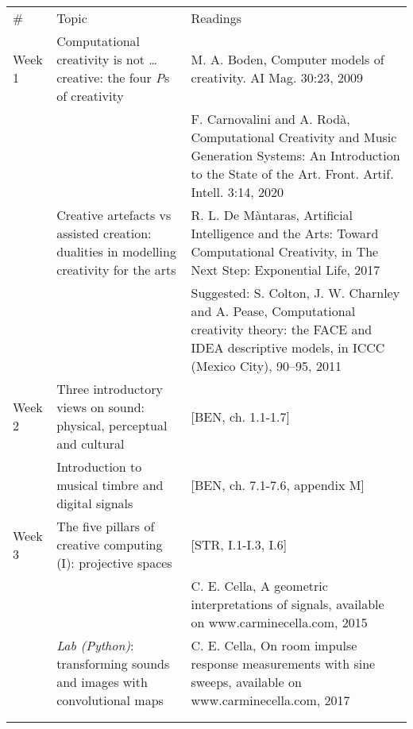 \documentclass[letterpaper]{inzane_syllabus} %
\begin{document}
\begin{center}
\begin{tabularx}{\textwidth}{p{2cm}p{8cm} @{\hskip 0.5cm} p{9.5cm}} %
\arrayrulecolor{myCOLOR}\hline
\hline 
\hline 

\multicolumn{3}{l}{\textbf{\textcolor{myCOLOR}{\large MODULE 1: Foundations }}} \\
\hline
  \# & Topic & Readings \\ \hline 
Week 1 &
Computational creativity is not \ldots creative: the four \emph{P}s of creativity & M. A. Boden, Computer models of creativity. AI Mag. 30:23, 2009 \\

& & F. Carnovalini and A. Rod\`a, Computational Creativity and Music Generation Systems: An Introduction to the State of the Art. Front. Artif. Intell. 3:14, 2020  \\

& Creative artefacts vs assisted creation: dualities in modelling creativity for the arts&  R. L. De M\`antaras, Artificial Intelligence and the Arts: Toward Computational Creativity, in The Next Step: Exponential Life, 2017\\
& &  Suggested: S. Colton, J. W. Charnley and A. Pease, Computational creativity theory: the FACE and IDEA descriptive models, in ICCC (Mexico City), 90–95, 2011 \\
\arrayrulecolor{maingray}\hline

Week 2 & Three introductory views on sound: physical, perceptual and cultural & [BEN, ch. 1.1-1.7]\\

& Introduction to musical timbre and digital signals & [BEN, ch. 7.1-7.6, appendix M]\\
\arrayrulecolor{maingray}\hline

Week 3 & The five pillars of creative computing (I): projective spaces & [STR, I.1-I.3, I.6]\\

& & C. E. Cella, A geometric interpretations of signals, available on www.carminecella.com, 2015\\

& \emph{Lab (Python)}: transforming sounds and images with convolutional maps & C. E. Cella, On room impulse response measurements with sine sweeps, available on www.carminecella.com, 2017 \\
& & \\ 
\arrayrulecolor{maingray}\hline


\end{tabularx}
\end{center}
\end{document}
